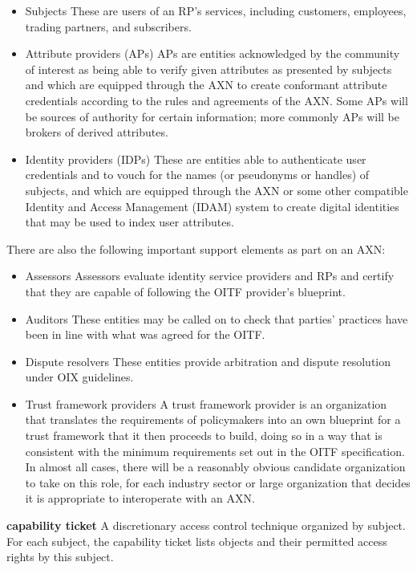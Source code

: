 \documentclass[../CIT288SecurityResearchNotebook.tex]{subfiles}
\begin{document}
\begin{itemize}\centering
	\item{Subjects} These are users of an RP’s services, 
		including customers, employees, trading partners, and subscribers.
	\item{Attribute providers (APs)} APs are entities acknowledged by 
		the community of interest as being able to verify given 
		attributes as presented by subjects and which are equipped 
		through the AXN to create conformant attribute 
		credentials according to the rules and agreements of the AXN. 
		Some APs will be sources of authority for certain information; 
		more commonly APs will be brokers of derived attributes.
	\item{Identity providers (IDPs)} These are entities able to 
		authenticate user credentials and to vouch for the names 
		(or pseudonyms or handles) of subjects, and which are 
		equipped through the AXN or some other compatible 
		Identity and Access Management (IDAM) system to create 
		digital identities that may be used to index user 
		attributes.
\end{itemize}
There are also the following important support elements as part on an AXN:
\begin{itemize}\centering
	\item{Assessors} Assessors evaluate identity service providers 
		and RPs and certify that they are capable of following 
		the OITF provider’s blueprint.
	\item{Auditors} These entities may be called on to check that 
		parties’ practices have been in line with what was agreed 
		for the OITF.
	\item{Dispute resolvers} These entities provide arbitration 
		and dispute resolution under OIX guidelines.
	\item{Trust framework providers} A trust framework provider 
		is an organization that translates the requirements 
		of policymakers into an own blueprint for a trust framework 
		that it then proceeds to build, doing so in a way that 
		is consistent with the minimum requirements set 
		out in the OITF specification. In almost all cases, 
		there will be a reasonably obvious candidate organization 
		to take on this role, for each industry sector or large 
		organization that decides it is appropriate to interoperate 
		with an AXN.
\end{itemize}



{\bf{capability ticket}} A discretionary access control technique 
organized by subject. For each subject, the capability 
ticket lists objects and their permitted access 
rights by this subject.
\end{document}

